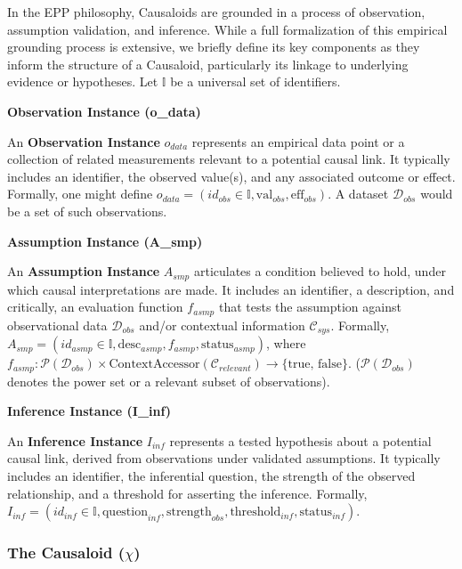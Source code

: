 In the EPP philosophy, Causaloids are grounded in a process of observation, assumption validation, and inference. While a full formalization of this empirical grounding process is extensive, we briefly define its key components as they inform the structure of a Causaloid, particularly its linkage to underlying evidence or hypotheses. Let \(\mathbb{I}\) be a universal set of identifiers.

    
\textbf{Observation Instance (o\_data)}
        
        An \textbf{Observation Instance} \(o_{data}\) represents an empirical data point or a collection of related measurements relevant to a potential causal link. It typically includes an identifier, the observed value(s), and any associated outcome or effect. Formally, one might define \(o_{data} = (id_{obs} \in \mathbb{I}, \text{val}_{obs}, \text{eff}_{obs})\). A dataset \(\mathcal{D}_{obs}\) would be a set of such observations.

\textbf{Assumption Instance (A\_smp)}

        An \textbf{Assumption Instance} \(A_{smp}\) articulates a condition believed to hold, under which causal interpretations are made. It includes an identifier, a description, and critically, an evaluation function \(f_{asmp}\) that tests the assumption against observational data \(\mathcal{D}_{obs}\) and/or contextual information \(\mathcal{C}_{sys}\). Formally, \(A_{smp} = (id_{asmp} \in \mathbb{I}, \text{desc}_{asmp}, f_{asmp}, \text{status}_{asmp})\), where \(f_{asmp}: \mathcal{P}(\mathcal{D}_{obs}) \times \text{ContextAccessor}(\mathcal{C}_{relevant}) \to \{\text{true, false}\}\). (\(\mathcal{P}(\mathcal{D}_{obs})\) denotes the power set or a relevant subset of observations).


\textbf{Inference Instance (I\_inf)}

An \textbf{Inference Instance} \(I_{inf}\) represents a tested hypothesis about a potential causal link, derived from observations under validated assumptions. It typically includes an identifier, the inferential question, the strength of the observed relationship, and a threshold for asserting the inference. Formally, \(I_{inf} = (id_{inf} \in \mathbb{I}, \text{question}_{inf}, \text{strength}_{obs}, \text{threshold}_{inf}, \text{status}_{inf})\).


\subsubsection[The Causaloid (chi)]{The Causaloid (\(\chi\))}
\label{ssec:causaloid_formal}

